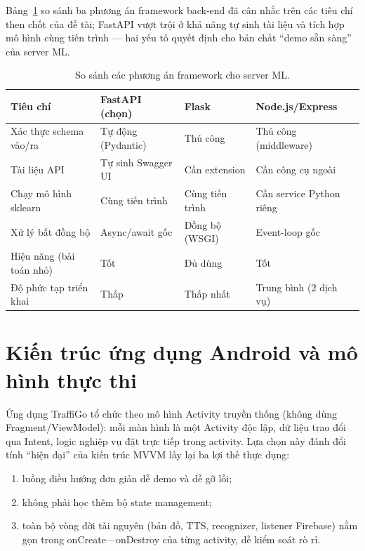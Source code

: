 Bảng~\ref{tab:beframe} so sánh ba phương án framework back-end đã cân nhắc trên các tiêu chí then chốt của đề tài; FastAPI vượt trội ở khả năng tự sinh tài liệu và tích hợp mô hình cùng tiến trình --- hai yếu tố quyết định cho bản chất ``demo sẵn sàng'' của server ML.

\begin{table}[h!]
\centering
\caption{So sánh các phương án framework cho server ML.}
\label{tab:beframe}
\small
\begin{tabularx}{\textwidth}{lXXX}
\toprule
\textbf{Tiêu chí} & \textbf{FastAPI (chọn)} & \textbf{Flask} & \textbf{Node.js/Express}\\
\midrule
Xác thực schema vào/ra & Tự động (Pydantic) & Thủ công & Thủ công (middleware)\\
Tài liệu API & Tự sinh Swagger UI & Cần extension & Cần công cụ ngoài\\
Chạy mô hình sklearn & Cùng tiến trình & Cùng tiến trình & Cần service Python riêng\\
Xử lý bất đồng bộ & Async/await gốc & Đồng bộ (WSGI) & Event-loop gốc\\
Hiệu năng (bài toán nhỏ) & Tốt & Đủ dùng & Tốt\\
Độ phức tạp triển khai & Thấp & Thấp nhất & Trung bình (2 dịch vụ)\\
\bottomrule
\end{tabularx}
\end{table}

\section{Kiến trúc ứng dụng Android và mô hình thực thi}
Ứng dụng TraffiGo tổ chức theo mô hình Activity truyền thống (không dùng Fragment/ViewModel): mỗi màn hình là một Activity độc lập, dữ liệu trao đổi qua Intent, logic nghiệp vụ đặt trực tiếp trong activity. Lựa chọn này đánh đổi tính ``hiện đại'' của kiến trúc MVVM lấy lại ba lợi thế thực dụng:
\begin{enumerate}[label=(\roman*),leftmargin=2.2cm,itemsep=2pt]
 \item luồng điều hướng đơn giản dễ demo và dễ gỡ lỗi;
 \item không phải học thêm bộ state management;
 \item toàn bộ vòng đời tài nguyên (bản đồ, TTS, recognizer, listener Firebase) nằm gọn trong onCreate---onDestroy của từng activity, dễ kiểm soát rò rỉ.
\end{enumerate}

